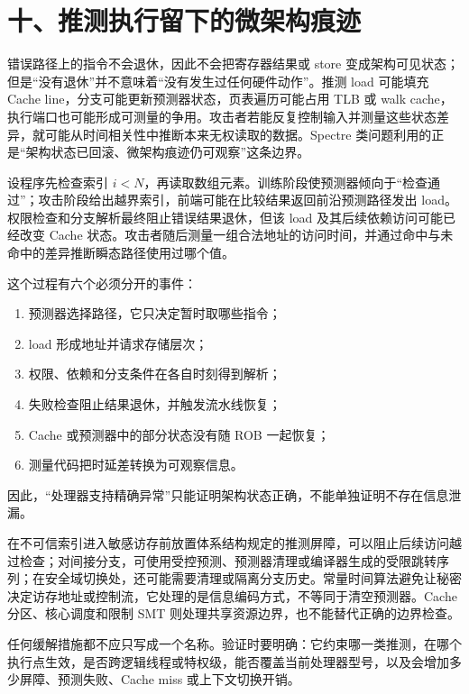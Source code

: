 \section{十、推测执行留下的微架构痕迹}

错误路径上的指令不会退休，因此不会把寄存器结果或 store 变成架构可见状态；但是“没有退休”并不意味着“没有发生过任何硬件动作”。推测 load 可能填充 Cache line，分支可能更新预测器状态，页表遍历可能占用 TLB 或 walk cache，执行端口也可能形成可测量的争用。攻击者若能反复控制输入并测量这些状态差异，就可能从时间相关性中推断本来无权读取的数据。Spectre 类问题利用的正是“架构状态已回滚、微架构痕迹仍可观察”这条边界。\cite{linux-speculation,linux-spectre}

设程序先检查索引 $i<N$，再读取数组元素。训练阶段使预测器倾向于“检查通过”；攻击阶段给出越界索引，前端可能在比较结果返回前沿预测路径发出 load。权限检查和分支解析最终阻止错误结果退休，但该 load 及其后续依赖访问可能已经改变 Cache 状态。攻击者随后测量一组合法地址的访问时间，并通过命中与未命中的差异推断瞬态路径使用过哪个值。

这个过程有六个必须分开的事件：

\begin{enumerate}[leftmargin=2.2em]
  \item 预测器选择路径，它只决定暂时取哪些指令；
  \item load 形成地址并请求存储层次；
  \item 权限、依赖和分支条件在各自时刻得到解析；
  \item 失败检查阻止结果退休，并触发流水线恢复；
  \item Cache 或预测器中的部分状态没有随 ROB 一起恢复；
  \item 测量代码把时延差转换为可观察信息。
\end{enumerate}

因此，“处理器支持精确异常”只能证明架构状态正确，不能单独证明不存在信息泄漏。

在不可信索引进入敏感访存前放置体系结构规定的推测屏障，可以阻止后续访问越过检查；对间接分支，可使用受控预测、预测器清理或编译器生成的受限跳转序列；在安全域切换处，还可能需要清理或隔离分支历史。常量时间算法避免让秘密决定访存地址或控制流，它处理的是信息编码方式，不等同于清空预测器。Cache 分区、核心调度和限制 SMT 则处理共享资源边界，也不能替代正确的边界检查。

任何缓解措施都不应只写成一个名称。验证时要明确：它约束哪一类推测，在哪个执行点生效，是否跨逻辑线程或特权级，能否覆盖当前处理器型号，以及会增加多少屏障、预测失败、Cache miss 或上下文切换开销。

